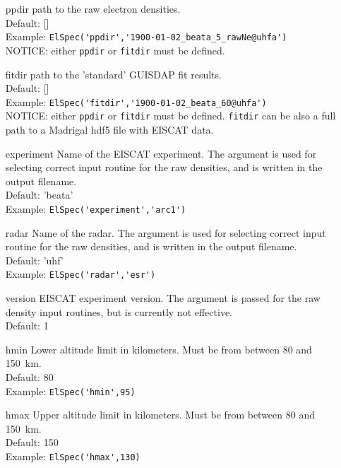 \documentclass[12pt,a4paper]{report}
\begin{document}
\begin{itemize}

\item[ppdir] path to the raw electron densities.\\
Default: []\\
Example: \verb|ElSpec('ppdir','1900-01-02_beata_5_rawNe@uhfa')|\\
NOTICE: either \verb|ppdir| or \verb|fitdir| must be defined.

\item[fitdir] path to the 'standard' GUISDAP fit results.\\
Default: []\\
Example: \verb|ElSpec('fitdir','1900-01-02_beata_60@uhfa')|\\
NOTICE: either \verb|ppdir| or \verb|fitdir| must be defined. \verb|fitdir| can be also a full path to a Madrigal hdf5 file with EISCAT data. 

\item[experiment] Name of the EISCAT experiment. The argument is used for selecting correct input routine for the raw densities, and is written in the output filename.\\
Default: 'beata' \\
Example: \verb|ElSpec('experiment','arc1')|\\

\item[radar] Name of the radar.  The argument is used for selecting correct input routine for the raw densities, and is written in the output filename.\\
Default: 'uhf'\\
Example: \verb|ElSpec('radar','esr')|\\

\item[version] EISCAT experiment version. The argument is passed for the raw density input routines, but is currently not effective.\\
Default: 1 \\

\item[hmin] Lower altitude limit in kilometers. Must be from between 80 and 150~km.\\
Default: 80\\
Example: \verb|ElSpec('hmin',95)|\\

\item[hmax] Upper altitude limit in kilometers. Must be from between 80 and 150~km.\\
Default: 150\\
Example: \verb|ElSpec('hmax',130)|\\


\end{itemize}
\end{document}
